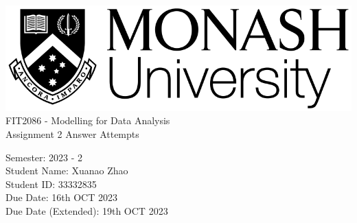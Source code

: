 \begin{titlepage}

  \includegraphics[width=0.25\linewidth]{monashlogo.png} \\
  
  
  \pstitle
  FIT2086 - Modelling for Data Analysis \\
  Assignment 2 Answer Attempts

  \vspace{2cm}
  
  \pspara
  Semester: 2023 - 2 \\
  Student Name: Xuanao Zhao \\
  Student ID: 33332835 \\
  Due Date: 16th OCT 2023 \\
  Due Date (Extended): 19th OCT 2023

  \vspace{5cm}


\end{titlepage}